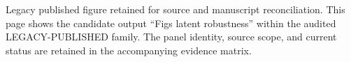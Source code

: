 Legacy published figure retained for source and manuscript reconciliation. This page shows the candidate output ``Figs latent robustness'' within the audited LEGACY-PUBLISHED family. The panel identity, source scope, and current status are retained in the accompanying evidence matrix.
